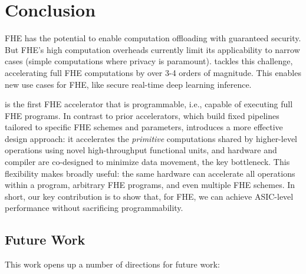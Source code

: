 \chapter{Conclusion}

FHE has the potential to enable computation offloading with guaranteed security.
But FHE's high computation overheads currently limit its applicability to narrow
cases (simple computations where privacy is paramount).
\name tackles this challenge, accelerating full FHE computations by over 3-4 orders of magnitude.
This enables new use cases for FHE, like secure real-time deep learning inference.

\name is the first FHE accelerator that is programmable,
i.e., capable of executing full FHE programs.
In contrast to prior accelerators, which build fixed pipelines tailored to specific FHE schemes and parameters,
\name introduces a more effective design approach:
it accelerates the \emph{primitive} computations shared by higher-level operations
using novel high\hyp{}throughput functional units,
and hardware and compiler are co-designed to minimize data movement,
the key bottleneck. %
This flexibility makes \name broadly useful:
the same hardware can accelerate all operations within a program,
arbitrary FHE programs, and even multiple FHE schemes.
In short, our key contribution is to show that, for FHE,
we can achieve ASIC-level performance without sacrificing programmability.

\section{Future Work}

This work opens up a number of directions for future work:

